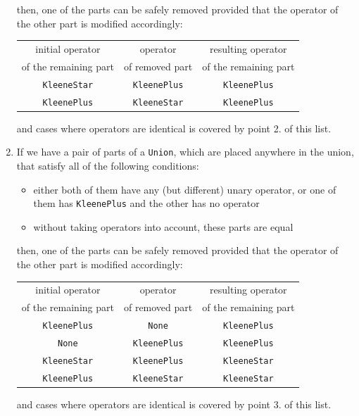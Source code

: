 \documentclass{article}
\begin{document}
\begin{enumerate}
\begin{itemize}
  \end{itemize}

  then, one of the parts can be safely removed provided that the operator of the other part is
  modified accordingly:

  \noindent
  \begin{tabular}{c|c|c}
  initial operator & operator & resulting operator \\
  of the remaining part & of removed part & of the remaining part \\ \hline
  \verb|KleeneStar| & \verb|KleenePlus| & \verb|KleenePlus| \\
  \verb|KleenePlus| & \verb|KleeneStar| & \verb|KleenePlus| \\
  \end{tabular}
  
  \vspace{10pt}
  and cases where operators are identical is covered by point 2. of this list.

  \item If we have a pair of parts of a \verb|Union|, which are placed anywhere in the union, that
  satisfy all of the following conditions:

  \begin{itemize}

    \item either both of them have any (but different) unary operator, or one of them has
    \verb|KleenePlus| and the other has no operator

    \item without taking operators into account, these parts are equal

  \end{itemize}

  then, one of the parts can be safely removed provided that the operator of the other part is
  modified accordingly:

  \noindent
  \begin{tabular}{c|c|c}
  initial operator & operator & resulting operator \\
  of the remaining part & of removed part & of the remaining part \\ \hline
  \verb|KleenePlus| & \verb|None| & \verb|KleenePlus| \\
  \verb|None| & \verb|KleenePlus| & \verb|KleenePlus| \\
  \verb|KleeneStar| & \verb|KleenePlus| & \verb|KleeneStar| \\
  \verb|KleenePlus| & \verb|KleeneStar| & \verb|KleeneStar| \\
  \end{tabular}
  
  \vspace{10pt}
  and cases where operators are identical is covered by point 3. of this list.

\end{enumerate}
\end{document}
